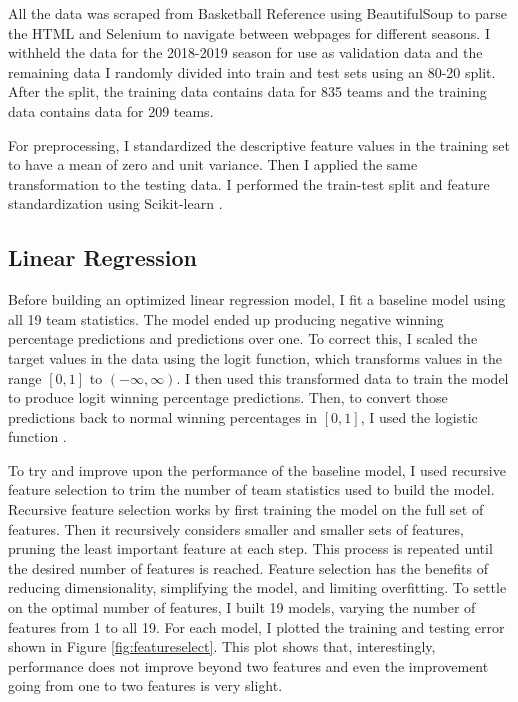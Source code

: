 \documentclass[pageno]{jpaper}
\begin{document}
All the data was scraped from Basketball Reference \cite{bballref} using BeautifulSoup \cite{soup} to parse the HTML and Selenium \cite{selenium} to navigate between webpages for different seasons. I withheld the data for the 2018-2019 season for use as validation data and the remaining data I randomly divided into train and test sets using an 80-20 split. After the split, the training data contains data for 835 teams and the training data contains data for 209 teams.

For preprocessing, I standardized the descriptive feature values in the training set to have a mean of zero and unit variance. Then I applied the same transformation to the testing data. I performed the train-test split and feature standardization using Scikit-learn \cite{scikit-learn}.

\subsection{Linear Regression}

Before building an optimized linear regression model, I fit a baseline model using all 19 team statistics. The model ended up producing negative winning percentage predictions and predictions over one. To correct this, I scaled the target values in the data using the logit function, which transforms values in the range $[0, 1]$ to $(-\infty, \infty)$. I then used this transformed data to train the model to produce logit winning percentage predictions. Then, to convert those predictions back to normal winning percentages in $[0, 1]$, I used the logistic function \cite{wikilogit,stackoverflow}.

To try and improve upon the performance of the baseline model, I used recursive feature selection to trim the number of team statistics used to build the model.
Recursive feature selection works by first training the model on the full set of features. Then it recursively considers smaller and smaller sets of features, pruning the least important feature at each step. This process is repeated until the desired number of features is reached. Feature selection has the benefits of reducing dimensionality, simplifying the model, and limiting overfitting. To settle on the optimal number of features, I built 19 models, varying the number of features from 1 to all 19. For each model, I plotted the training and testing error shown in Figure \ref{fig:featureselect}. This plot shows that, interestingly, performance does not improve beyond two features and even the improvement going from one to two features is very slight.
\end{document}
